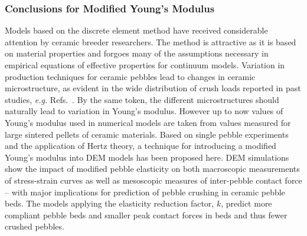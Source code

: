 \subsubsection{Conclusions for Modified Young's Modulus}
Models based on the discrete element method have received considerable attention by ceramic breeder researchers. The method is attractive as it is based on material properties and forgoes many of the assumptions necessary in empirical equations of effective properties for continuum models. Variation in production techniques for ceramic pebbles lead to changes in ceramic microstructure, as evident in the wide distribution of crush loads reported in past studies, \textit{e.g.} Refs.~\cite{Zhao2012,Mandal2012a}. By the same token, the different microstructures should naturally lead to variation in Young’s modulus. However up to now values of Young’s modulus used in numerical models are taken from values measured for large sintered pellets of ceramic materials. Based on single pebble experiments and the application of Hertz theory, a technique for introducing a modified Young’s modulus into DEM models has been proposed here. DEM simulations show the impact of modified pebble elasticity on both macroscopic measurements of stress-strain curves as well as mesoscopic measures of inter-pebble contact force – with major implications for prediction of pebble crushing in ceramic pebble beds. The models applying the elasticity reduction factor, $k$, predict more compliant pebble beds and smaller peak contact forces in beds and thus fewer crushed pebbles.